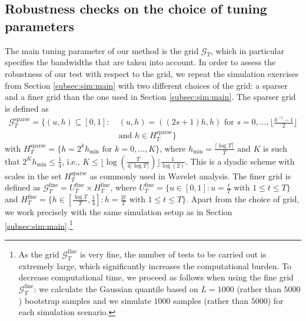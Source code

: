 \documentclass[12pt]{article}
\begin{document}
\subsection{Robustness checks on the choice of tuning parameters}\label{subsec:sim:grid}


The main tuning parameter of our method is the grid $\mathcal{G}_T$, which in particular specifies the bandwidths that are taken into account. In order to assess the robustness of our test with respect to the grid, we repeat the simulation exercises from Section \ref{subsec:sim:main} with two different choices of the grid: a sparser and a finer grid than the one used in Section \ref{subsec:sim:main}.
The sparser grid is defined as
\begin{align}
\mathcal{G}_T^{\text{sparse}} = \big\{ (u,h) \subseteq [0,1]: & \ (u,h) = ((2s+1) h, h) \text{ for } s = 0,\ldots,\Big\lfloor \frac{h^ {-1}-1}{2} \Big\rfloor \nonumber \\ & \ \text{and } h \in H_T^{\text{sparse}} \big\} \label{eq:grid-sparse}
\end{align}
with $H_T^{\text{sparse}} = \{ h = 2^k h_{\min} \text{ for } k=0,\ldots,K \}$, where $h_{\min} = \frac{\lceil \log T \rceil}{T}$ and $K$ is such that $2^K h_{\min} \le \frac{1}{4}$, i.e., $K \le \lfloor \log(\frac{T}{4 \lceil \log T \rceil }) \rfloor \frac{1}{\log(2)}$. This is a dyadic scheme with scales in the set $H_T^{\text{sparse}}$ as commonly used in Wavelet analysis. 
The finer grid is defined as
$\mathcal{G}_T^{\text{fine}} = U_T^{\text{fine}} \times H_T^{\text{fine}}$,
where  
$U_T^{\text{fine}}  = \{ u \in [0,1]: u = \textstyle{\frac{t}{T}} \text{ with } 1 \le t \le T \}$
and
$H_T^{\text{fine}} = \{ h \in [ \textstyle{\frac{\log T}{T}}, \textstyle{\frac{1}{4}} ]:  h = \textstyle{\frac{2t}{T}} \text{ with } 1 \le t \le T \}$. Apart from the choice of grid, we work precisely with the same simulation setup as in Section \ref{subsec:sim:main}.\footnote{As the grid $\mathcal{G}_T^{\text{fine}}$ is very fine, the number of tests to be carried out is extremely large, which significantly increases the computational burden. To decrease computational time, we proceed as follows when using the fine grid $\mathcal{G}_T^{\text{fine}}$:  we calculate the Gaussian quantile based on $L = 1000$ (rather than $5000$) bootstrap samples and we simulate $1000$ samples (rather than $5000$) for each simulation scenario.}
\end{document}
